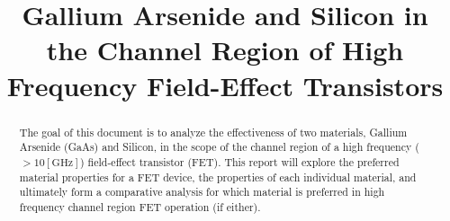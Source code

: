 \documentclass[conference]{IEEEtran}
\begin{document}
\title{Gallium Arsenide and Silicon in the Channel Region of High Frequency Field-Effect Transistors\\
}

\author{
}

\maketitle

\begin{abstract}
  The goal of this document is to analyze the effectiveness of two materials, Gallium Arsenide (GaAs) and Silicon, in the scope of the channel region of a high frequency ($>10[\si{\giga\hertz}]$) field-effect transistor (FET). This report will explore the preferred material properties for a FET device, the properties of each individual material, and ultimately form a comparative analysis for which material is preferred in high frequency channel region FET operation (if either).
\end{abstract}
\end{document}
